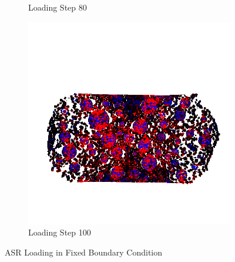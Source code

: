 \begin{figure}[ht]
\begin{subfigure}{.33\textwidth}
      \caption{Loading Step 80}
      \end{subfigure}%
      \begin{subfigure}{.33\textwidth}
        \centering
        \includegraphics[width=1.0\linewidth]{Files/A30P75_3_IS/DEP50-STEP(120).png}
        \caption{Loading Step 100}
      \end{subfigure}

  \caption{ASR Loading in Fixed Boundary Condition}
  \label{fig:ASR_Loading}
\end{figure}

